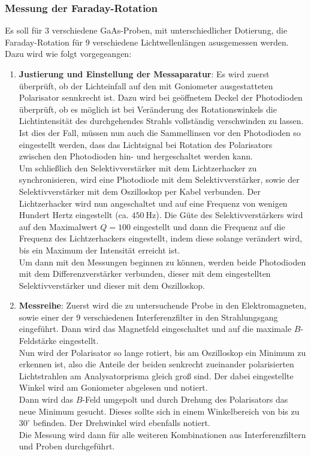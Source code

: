 \subsubsection{Messung der Faraday-Rotation}
Es soll für $3$ verschiedene GaAs-Proben, mit unterschiedlicher Dotierung, die Faraday-Rotation für $9$ verschiedene Lichtwellenlängen asusgemessen werden. \\
Dazu wird wie folgt vorgegeangen:
\begin{enumerate}
    \item \textbf{Justierung und Einstellung der Messaparatur}:
    Es wird zuerst überprüft, ob der Lichteinfall auf den mit Goniometer ausgestatteten Polarisator sennkrecht ist. Dazu wird bei geöffnetem Deckel der Photodioden überprüft, ob es möglich ist bei Veränderung des Rotationswinkels die Lichtintensität des durchgehendes Strahls vollständig verschwinden zu lassen. \\
    Ist dies der Fall, müssen nun auch die Sammellinsen vor den Photodioden so eingestellt werden, dass das Lichtsignal bei Rotation des Polarisators zwischen den Photodioden hin- und hergeschaltet werden kann. \\
    Um schließlich den Selektivverstärker mit dem Lichtzerhacker zu synchronisieren, wird eine Photodiode mit dem Selektivverstärker, sowie der Selektivverstärker mit dem Oszilloskop per Kabel verbunden. Der Lichtzerhacker wird nun angeschaltet und auf eine Frequenz von wenigen Hundert Hertz eingestellt (ca. $\qty{450}{\hertz}$). Die Güte des Selektivverstärkers wird auf den Maximalwert $Q=100$ eingestellt und dann die Frequenz auf die Frequenz des Lichtzerhackers eingestellt, indem diese solange verändert wird, bis ein Maximum der Intensität erreicht ist. \\
    Um dann mit den Messungen beginnen zu können, werden beide Photodioden mit dem Differenzverstärker verbunden, dieser mit dem eingestellten Selektivverstärker und dieser mit dem Oszilloskop.
    \item \textbf{Messreihe}:
    Zuerst wird die zu untersuchende Probe in den Elektromagneten, sowie einer der $9$ verschiedenen Interferenzfilter in den Strahlungsgang eingeführt. Dann wird das Magnetfeld eingeschaltet und auf die maximale $B$-Feldstärke eingestellt.\\
    Nun wird der Polarisator so lange rotiert, bis am Oszilloskop ein Minimum zu erkennen ist, also die Anteile der beiden senkrecht zueinander polarisierten Lichtstrahlen am Analysatorprisma gleich groß sind. Der dabei eingestellte Winkel wird am Goniometer abgelesen und notiert. \\
    Dann wird das $B$-Feld umgepolt und durch Drehung des Polarisators das neue Minimum gesucht. Dieses sollte sich in einem Winkelbereich von bis zu $30^\circ$ befinden. Der Drehwinkel wird ebenfalls notiert. \\
    Die Messung wird dann für alle weiteren Kombinationen aus Interferenzfiltern und Proben durchgeführt.
\end{enumerate}



